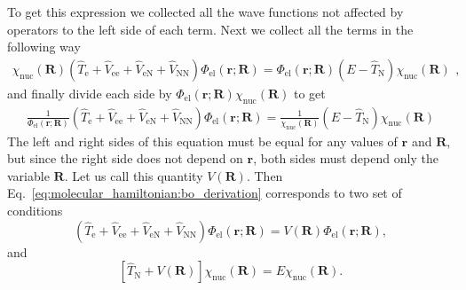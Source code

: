 \documentclass[../Main/chem532-notes.tex]{subfiles}
\begin{document}
To get this expression we collected all the wave functions not affected by operators to the left side of each term. Next we collect all the terms in the following way
\begin{equation}
\begin{split}
\chi_{\mathrm{nuc}}(\mathbf{R})(\hat{T}_\mathrm{e} + \hat{V}_\mathrm{ee} + \hat{V}_\mathrm{eN} +\hat{V}_\mathrm{NN}) \Phi_{\mathrm{el}}(\mathbf{r};\mathbf{R}) 
=\Phi_{\mathrm{el}}(\mathbf{r};\mathbf{R})    ( E - \hat{ T}_\mathrm{N}) 
\chi_{\mathrm{nuc}}(\mathbf{R})
\end{split},
\end{equation}
and finally divide each side by $\Phi_{\mathrm{el}}(\mathbf{r};\mathbf{R})\chi_{\mathrm{nuc}}(\mathbf{R})$ to get
\begin{equation}
\label{eq:molecular_hamiltonian:bo_derivation}
\begin{split}
\frac{1}{\Phi_{\mathrm{el}}(\mathbf{r};\mathbf{R}) } (\hat{T}_\mathrm{e} + \hat{V}_\mathrm{ee} + \hat{V}_\mathrm{eN} +\hat{V}_\mathrm{NN}) \Phi_{\mathrm{el}}(\mathbf{r};\mathbf{R}) = \frac{1}{\chi_{\mathrm{nuc}}(\mathbf{R})
}  ( E - \hat{ T}_\mathrm{N}) 
\chi_{\mathrm{nuc}}(\mathbf{R})
\end{split}
\end{equation}
The left and right sides of this equation must be equal for any values of $\mathbf{r}$ and $\mathbf{R}$, but since the right side does not depend on $\mathbf{r}$, both sides must depend only the variable $\mathbf{R}$.
Let us call this quantity $V(\mathbf{R})$.
Then Eq.~\eqref{eq:molecular_hamiltonian:bo_derivation} corresponds to two set of conditions
\begin{equation}
\label{eq:molecular_hamiltonian:electronic_se}
(\hat{T}_\mathrm{e} + \hat{V}_\mathrm{ee} + \hat{V}_\mathrm{eN} +\hat{V}_\mathrm{NN} ) \Phi_{\mathrm{el}}(\mathbf{r};\mathbf{R}) = V(\mathbf{R}) \Phi_{\mathrm{el}}(\mathbf{r};\mathbf{R}),
\end{equation}
and
\begin{equation}
\label{eq:molecular_hamiltonian:nuclear_se}
[\hat{ T}_\mathrm{N} + V(\mathbf{R}) ] \chi_{\mathrm{nuc}}(\mathbf{R})  =E \chi_{\mathrm{nuc}}(\mathbf{R}).
\end{equation}
\end{document}
